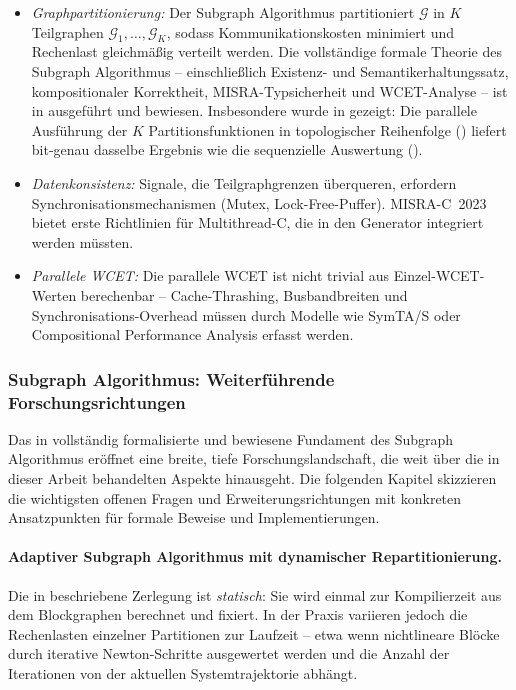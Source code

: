 ﻿\documentclass[12pt,a4paper]{article}
\theoremstyle{definition}
\begin{document}
\begin{itemize}
  \item \emph{Graphpartitionierung:} Der Subgraph Algorithmus
        \cite{subgraph2026} partitioniert $\mathcal{G}$ in $K$ Teilgraphen
        $\mathcal{G}_1, \ldots, \mathcal{G}_K$, sodass
        Kommunikationskosten minimiert und Rechenlast gleichmäßig
        verteilt werden. Die vollständige formale Theorie des Subgraph
        Algorithmus -- einschließlich Existenz- und Semantikerhaltungssatz,
        kompositionaler Korrektheit, MISRA-Typsicherheit und WCET-Analyse --
        ist in  ausgeführt und bewiesen.
        Insbesondere wurde in  gezeigt:
        Die parallele Ausführung der $K$ Partitionsfunktionen in
        topologischer Reihenfolge () liefert
        bit-genau dasselbe Ergebnis wie die sequenzielle Auswertung
        ().

  \item \emph{Datenkonsistenz:} Signale, die Teilgraphgrenzen
        überqueren, erfordern Synchronisationsmechanismen (Mutex,
        Lock-Free-Puffer). MISRA-C~2023 bietet erste Richtlinien für
        Multithread-C, die in den Generator integriert werden müssten.

  \item \emph{Parallele WCET:} Die parallele WCET ist nicht trivial
        aus Einzel-WCET-Werten berechenbar -- Cache-Thrashing,
        Busbandbreiten und Synchronisations-Overhead müssen durch
        Modelle wie SymTA/S oder Compositional Performance Analysis
        erfasst werden.
\end{itemize}

\subsubsection{Subgraph Algorithmus: Weiterführende Forschungsrichtungen}
\label{subsubsec:subgraph-future}

Das in  vollständig formalisierte und bewiesene
Fundament des Subgraph Algorithmus eröffnet eine breite, tiefe
Forschungslandschaft, die weit über die in dieser Arbeit behandelten
Aspekte hinausgeht. Die folgenden Kapitel skizzieren die wichtigsten
offenen Fragen und Erweiterungsrichtungen mit konkreten Ansatzpunkten
für formale Beweise und Implementierungen.

\paragraph{Adaptiver Subgraph Algorithmus mit dynamischer Repartitionierung.}
Die in  beschriebene Zerlegung ist \emph{statisch}:
Sie wird einmal zur Kompilierzeit aus dem Blockgraphen berechnet und
fixiert. In der Praxis variieren jedoch die Rechenlasten einzelner
Partitionen zur Laufzeit -- etwa wenn nichtlineare Blöcke durch
iterative Newton-Schritte ausgewertet werden und die Anzahl der
Iterationen von der aktuellen Systemtrajektorie abhängt.
\end{document}
